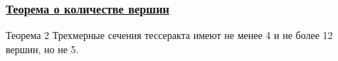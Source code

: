 \documentclass[10pt,pdf,hyperref={unicode}]{beamer}
\begin{document}
\begin{frame}
	\frametitle{\hyperlink{theorem2}{Теорема о количестве вершин}}
	\hypertarget{theorem2_back}{}
	\begin{block}{Теорема 2}
		Трехмерные сечения тессеракта имеют не менее 4 и не более 12 вершин, но не 5.
	\end{block}
	\begin{columns}
	\end{columns}
\end{frame}
\end{document}
